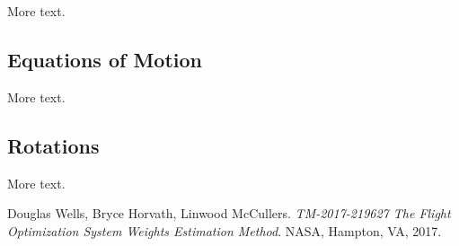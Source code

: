 \documentclass[11pt]{article} %
\begin{document}
More text.

\subsection{Equations of Motion}

More text.

\subsection{Rotations}

More text.

\pagebreak

\begin{thebibliography}{9}
Douglas Wells, Bryce Horvath, Linwood McCullers. 
\textit{TM-2017-219627 The Flight Optimization System Weights Estimation Method}. 
NASA, Hampton, VA, 2017.
\end{thebibliography}
\end{document}
